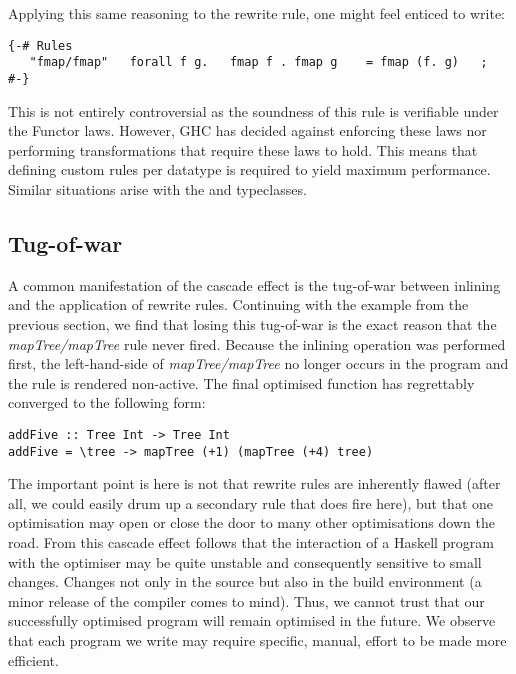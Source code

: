 Applying this same reasoning to the rewrite rule, one might feel enticed to write:

\begin{listing}[H]
\begin{verbatim}
{-# Rules
   "fmap/fmap"   forall f g.   fmap f . fmap g    = fmap (f. g)   ;
#-}
\end{verbatim}
\end{listing}

This is not entirely controversial as the soundness of this rule is verifiable under the Functor laws. However,
GHC has decided against enforcing these laws nor performing transformations that require these laws to hold.
This means that defining custom rules per datatype is required to yield maximum performance. Similar situations
arise with the  and  typeclasses.


\subsection{Tug-of-war}
\label{section:introduction:tug_of_war}

A common manifestation of the cascade effect is the tug-of-war between inlining and the application
of rewrite rules. Continuing with the  example from the previous section, we find that losing this
tug-of-war is the exact reason that the \textit{mapTree/mapTree} rule never fired. Because the inlining operation
was performed first, the left-hand-side of \textit{mapTree/mapTree} no longer occurs in the program and the rule
is rendered non-active. The final optimised function has regrettably converged to the following form:

\begin{verbatim}
addFive :: Tree Int -> Tree Int
addFive = \tree -> mapTree (+1) (mapTree (+4) tree)
\end{verbatim}

The important point is here is not that rewrite rules are inherently flawed (after all, we could easily
drum up a secondary rule that does fire here), but that one optimisation
may open or close the door to many other optimisations down the road.
From this cascade effect follows that the interaction of a Haskell program
with the optimiser may be quite unstable and consequently sensitive to small changes. 
Changes not only in the source but also in the build environment (a minor release of
the compiler comes to mind). Thus, we cannot trust that our successfully optimised program will remain
optimised in the future. We observe that each program we write may require specific, manual, 
effort to be made more efficient.

